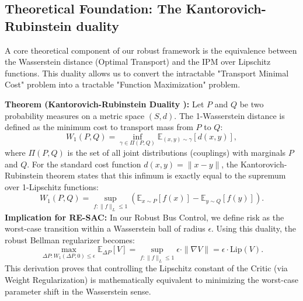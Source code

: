 \subsection{Theoretical Foundation: The Kantorovich-Rubinstein duality}
\label{app:kantorovich}
A core theoretical component of our robust framework is the equivalence between the Wasserstein distance (Optimal Transport) and the IPM over Lipschitz functions. This duality allows us to convert the intractable "Transport Minimal Cost" problem into a tractable "Function Maximization" problem.

\textbf{Theorem (Kantorovich-Rubinstein Duality \cite{Villani2009OptimalTransport}):}
Let $P$ and $Q$ be two probability measures on a metric space $(S, d)$. The 1-Wasserstein distance is defined as the minimum cost to transport mass from $P$ to $Q$:
\begin{equation}
    W_1(P, Q) = \inf_{\gamma \in \Pi(P, Q)} \mathbb{E}_{(x, y) \sim \gamma} [d(x, y)],
\end{equation}
where $\Pi(P, Q)$ is the set of all joint distributions (couplings) with marginals $P$ and $Q$.
For the standard cost function $d(x, y) = \|x - y\|$, the Kantorovich-Rubinstein theorem states that this infimum is exactly equal to the supremum over 1-Lipschitz functions:
\begin{equation}
    W_1(P, Q) = \sup_{f: \|f\|_L \le 1} \left( \mathbb{E}_{x \sim P}[f(x)] - \mathbb{E}_{y \sim Q}[f(y)] \right).
\end{equation}
\textbf{Implication for RE-SAC:}
In our Robust Bus Control, we define risk as the worst-case transition within a Wasserstein ball of radius $\epsilon$. Using this duality, the robust Bellman regularizer becomes:
\begin{equation}
    \max_{\Delta P: W_1(\Delta P, 0) \le \epsilon} \mathbb{E}_{\Delta P}[V] = \sup_{f: \|f\|_L \le 1} \epsilon \cdot \|\nabla V\| = \epsilon \cdot \text{Lip}(V).
\end{equation}
This derivation proves that controlling the Lipschitz constant of the Critic (via Weight Regularization) is mathematically equivalent to minimizing the worst-case parameter shift in the Wasserstein sense.

